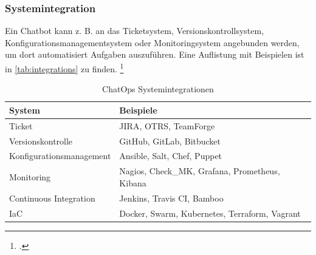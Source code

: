 
\subsubsection{Systemintegration}
Ein Chatbot kann z. B. an das Ticketsystem, Versionskontrollsystem, Konfigurationsmanagementsystem oder Monitoringsystem angebunden werden, um dort automatisiert Aufgaben auszuführen. Eine Auflistung mit Beispielen ist in \autoref{tab:integrations} zu finden.
\footcite[Vgl.][o. \pno]{Zyane_2017_ChatOps}

\begin{table}[H]
\centering
\begin{tabularx}{.8\textwidth}{l|X}
  System & Beispiele \\\hline
  Ticket& JIRA, OTRS, TeamForge \\
  Versionskontrolle & GitHub, GitLab, Bitbucket\\
  Konfigurationsmanagement & Ansible, Salt, Chef, Puppet\\
  Monitoring & Nagios, Check\_MK, Grafana, Prometheus, Kibana\\
  Continuous Integration & Jenkins, Travis CI, Bamboo\\
  \acf{IaC} & Docker, Swarm, Kubernetes, Terraform, Vagrant\\
\end{tabularx}
\caption{ChatOps Systemintegrationen}
\label{tab:integrations}
\end{table}

